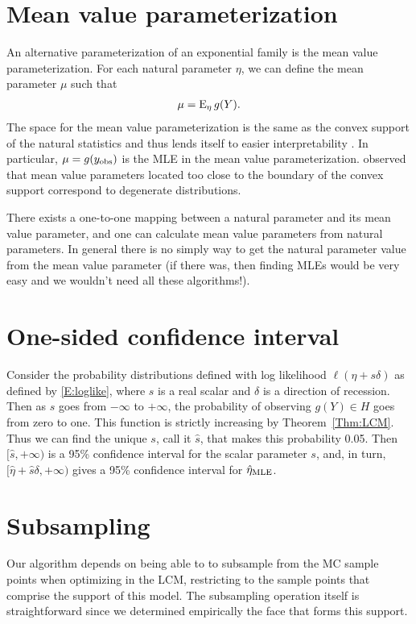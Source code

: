 \section{Mean value parameterization}

An alternative parameterization of an exponential family is the mean value 
parameterization.  For each natural parameter $\eta$, we can define the mean parameter 
$\mu$ such that
\begin{align*}
	\mu = \operatorname{E}_\eta g(Y).
\end{align*}
The space for the mean value parameterization is the same as the convex support of the 
natural statistics and thus lends itself to easier interpretability  \citep
{Handcock:degeneracy, Rinaldo:2009}.  In particular, $\mu = g(y_{\textrm{obs}})$ is the MLE in 
the mean value parameterization.  \citeauthor{Handcock:degeneracy} observed that mean 
value parameters located too close to the boundary of the convex support correspond to 
degenerate distributions.  

There exists a one-to-one mapping between a natural parameter and its mean value 
parameter, and one can calculate mean value parameters from natural parameters. In 
general there is no simply way to get the natural parameter value from the mean value 
parameter (if there was, then finding MLEs would be very easy and we wouldn't need all 
these algorithms!).


\section{One-sided confidence interval}

Consider the probability distributions defined with log likelihood $\ell( \eta + s 
\delta)$ as defined 
by \eqref{E:loglike}, where $s$ is a real scalar and $\delta$ is a direction of 
recession.  Then 
as $s$ goes from $-\infty$ to $+\infty$, the probability of observing $g(Y) \in H$ 
goes from zero to one.  This 
function is strictly increasing by Theorem~\ref{Thm:LCM}.  Thus we can find the unique 
$s$, call it $\hat{s}$, that makes 
this probability 0.05.  Then $[\hat{s}, +\infty)$ is a 95\% confidence interval for 
the scalar parameter 
$s$, and, in turn, $[\hat{\eta} + \hat{s}\delta, +\infty)$ gives a 95\% confidence 
interval for $\hat{\eta}_{\textrm{MLE}}
$.

\section{Subsampling}
Our algorithm depends on being able to to subsample from the MC sample points when 
optimizing in the LCM, restricting to the sample points that comprise the support of 
this model.  The subsampling operation itself is straightforward since we determined 
empirically the face that forms this support.  

